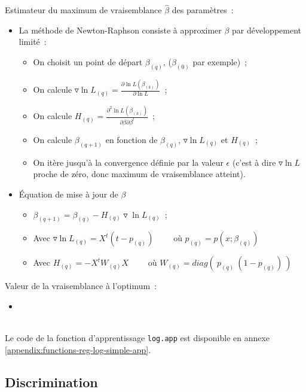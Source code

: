 \documentclass[a4paper,10pt]{report}
\begin{document}
Estimateur du maximum de vraisemblance $\hat{\beta}$ des paramètres~:
\begin{itemize}
	\item La méthode de Newton-Raphson consiste à approximer $\beta$ par développement limité~:
	\begin{itemize}
		\item On choisit un point de départ $\beta_{(q)}$, ($\beta_{(0)}$ par exemple)~;
		\item On calcule $\triangledown \ln L_{(q)} = \frac{\partial \ln L (\beta_{(k)})}{\partial \ln L}$~;
		\item On calcule $H_{(q)} = \frac{\partial^2 \ln L (\beta_{(k)})}{\partial \beta \partial \beta^t}$~;
		\item On calcule $\beta_{(q+1)}$ en fonction de $\beta_{(q)}$, $\triangledown \ln L_{(q)}$ et $H_{(q)}$~;
		\item On itère jusqu'à la convergence définie par la valeur $\epsilon$ (c'est à dire  $\triangledown \ln L$ proche de zéro, donc maximum de vraisemblance atteint).
	\end{itemize}
	\item Équation de mise à jour de $\beta$
	\begin{itemize}
		\item $ \beta_{(q+1)} = \beta_{(q)} - H_{(q)} \triangledown \ln L_{(q)} $~;
		\item Avec $\triangledown \ln L_{(q)} = X^t(t - p_{(q)}) \qquad$ où   $p_{(q)} = p(x;\beta_{(q)}) $
		\item Avec $H_{(q)} = -X^t W_{(q)} X \qquad$ où   $W_{(q)} = diag\left( \ p_{(q)} \ (1 - p_{(q)}) \ \right) $\\
	\end{itemize}
\end{itemize}


Valeur de la vraisemblance à l’optimum~:
\begin{itemize}
	\item %
\end{itemize}

~\\
Le code de la fonction d'apprentissage \texttt{log.app} est disponible en annexe \ref{appendix:functions-reg-log-simple-app}.



\subsection{Discrimination}
\end{document}
